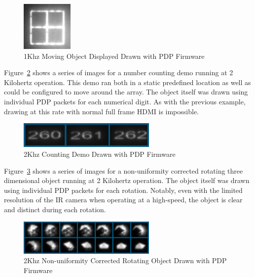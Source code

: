         \begin{figure}
            \centering
            \includegraphics{fig/high_speed_object.png}
            \caption{1Khz Moving Object Displayed Drawn with PDP Firmware}
            \label{fig:high_speed_object}
        \end{figure}

        Figure~\ref{fig:high_speed_numbers} shows a series of images for a number counting demo running at {2 Kilohertz} operation. This demo ran both in a static predefined location as well as could be configured to move around the array. The object itself was drawn using individual PDP packets for each numerical digit. As with the previous example, drawing at this rate with normal full frame HDMI is impossible.

        \begin{figure}
            \centering
            \includegraphics[width=0.6\textwidth]{fig/high_speed_numbers.png}
            \caption{2Khz Counting Demo Drawn with PDP Firmware}
            \label{fig:high_speed_numbers}
        \end{figure}

        Figure~\ref{fig:high_speed_rotating_object} shows a series of images for a non-uniformity corrected rotating three dimensional object running at {2 Kilohertz} operation. The object itself was drawn using individual PDP packets for each rotation. Notably, even with the limited resolution of the IR camera when operating at a high-speed, the object is clear and distinct during each rotation.

        \begin{figure}
            \centering
            \includegraphics[width=0.6\textwidth]{fig/high_speed_rotating_object.png}
            \caption{2Khz Non-uniformity Corrected Rotating Object Drawn with PDP Firmware}
            \label{fig:high_speed_rotating_object}
        \end{figure}

